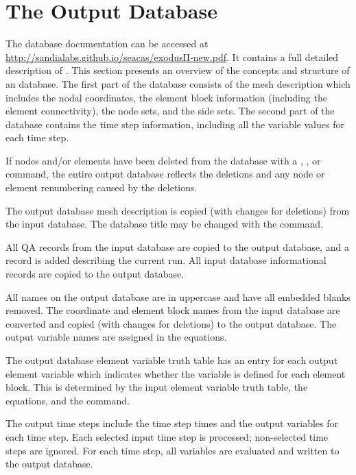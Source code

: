 \chapter{The Output \exo{} Database} \label{chap:outexo}

The \exo{} database documentation can be accessed at
\url{http://sandialabs.github.io/seacas/exodusII-new.pdf}. It contains
a full detailed description of \exo{}. This section presents an
overview of the concepts and structure of an \exo{} database. The
first part of the \exo{} database consists of the mesh
description which includes the nodal coordinates, the
element block information (including the element connectivity), the
node sets, and the side sets. The second part of the database contains
the time step information, including all the variable values for each
time step.

If nodes and/or elements have been deleted from the database with a
, , or  command, the entire output
database reflects the deletions and any node or element renumbering
caused by the deletions.

The output database mesh description is copied (with changes for
deletions) from the input database. The database title may be changed
with the  command.

All QA records from the input database are copied to the output
database, and a record is added describing the current \caps{\PROGRAM}
run. All input database informational records are copied to the output
database.

All names on the output database are in uppercase and have all embedded
blanks removed. The coordinate and element block names from the input
database are converted and copied (with changes for deletions) to the
output database. The output variable names are assigned in the
equations.

The output database element variable truth table has an entry for each
output element variable which indicates whether the variable is defined
for each element block. This is determined by the input element variable
truth table, the equations, and the  command.

The output time steps include the time step times and the output
variables for each time step. Each selected input time step is
processed; non-selected time steps are ignored. For
each time step, all variables are evaluated and written to the
output database.
